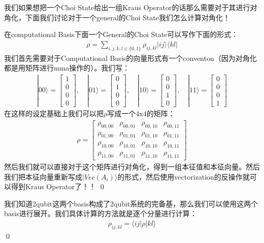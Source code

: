 我们如果想把一个Choi State给出一组Kraus Operator的话那么需要对于其进行对角化，下面我们讨论对于一个general的Choi State我们怎么计算对角化！

在computational Basis下面一个General的Choi State可以写作下面的形式：
\begin{align}
  \rho=\sum_{i,j,k,l\in\{0,1\}}\rho_{ij,kl}|ij\rangle\langle kl|
\end{align}
我们首先需要对于Computational Basis的向量形式有一个conventon（因为对角化都是用矩阵进行mma操作的）。我们写：
\begin{align}
 |00\rangle=\begin{bmatrix}1\\0\\0\\0\end{bmatrix}, \quad  |01\rangle=\begin{bmatrix}0\\1\\0\\0\end{bmatrix},\quad|10\rangle=\begin{bmatrix}0\\0\\1\\0\end{bmatrix},\quad|11\rangle=\begin{bmatrix}0\\0\\0\\1\end{bmatrix}
\end{align}
在这样的设定基础上我们可以把$ \rho $写成一个4x4的矩阵：
\begin{align}
  \rho=\begin{bmatrix}\rho_{00,00}&\rho_{00,01}&\rho_{00,10}&\rho_{00,11}\\\rho_{01,00}&\rho_{01,01}&\rho_{01,10}&\rho_{01,11}\\\rho_{10,00}&\rho_{10,01}&\rho_{10,10}&\rho_{10,11}\\\rho_{11,00}&\rho_{11,01}&\rho_{11,10}&\rho_{11,11}\end{bmatrix}
\end{align}
然后我们就可以直接对于这个矩阵进行对角化，得到一组本征值和本征向量。然后我们把本征向量重新写成$ |Vec(A_i)\rangle $的形式，然后使用vectorization的反操作就可以得到Kraus Operator了！！
\qed



\bigskip
{}

我们知道2qubit这两个basis构成了2qubit系统的完备基，那么我们可以使用这两个basis进行展开。我们具体计算的方法就是逐个分量进行计算：
\begin{align}
  \rho_{ij,kl}= \langle ij|\rho|kl\rangle
\end{align}
\qed



